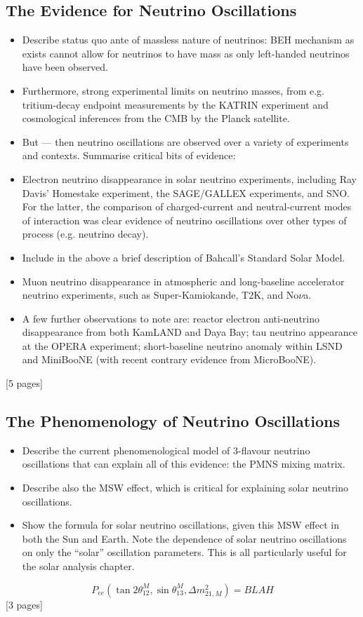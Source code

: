 {\subsection{The Evidence for Neutrino Oscillations}\label{sec:nu_osc_evidence}
\begin{itemize}
    \item Describe status quo ante of massless nature of neutrinos: BEH mechanism as exists cannot allow for neutrinos to have mass as only left-handed neutrinos have been observed.
    \item Furthermore, strong experimental limits on neutrino masses, from e.g. tritium-decay endpoint measurements by the KATRIN experiment and cosmological inferences from the CMB by the Planck satellite.
    \item But --- then neutrino oscillations are observed over a variety of experiments and contexts. Summarise critical bits of evidence:
    \item Electron neutrino disappearance in solar neutrino experiments, including Ray Davis' Homestake experiment, the SAGE/GALLEX experiments, and SNO. For the latter, the comparison of charged-current and neutral-current modes of interaction was clear evidence of neutrino oscillations over other types of process (e.g. neutrino decay).
    \item Include in the above a brief description of Bahcall's Standard Solar Model.
    \item Muon neutrino disappearance in atmospheric and long-baseline accelerator neutrino experiments, such as Super-Kamiokande, T2K, and No$\nu$a.
    \item A few further observations to note are: reactor electron anti-neutrino disappearance from both KamLAND and Daya Bay; tau neutrino appearance at the OPERA experiment; short-baseline neutrino anomaly within LSND and MiniBooNE (with recent contrary evidence from MicroBooNE).
\end{itemize}
[5 pages]
\subsection{The Phenomenology of Neutrino Oscillations}
\begin{itemize}
    \item Describe the current phenomenological model of 3-flavour neutrino oscillations that can explain all of this evidence: the PMNS mixing matrix.
    \item Describe also the MSW effect, which is critical for explaining solar neutrino oscillations.
    \item Show the formula for solar neutrino oscillations, given this MSW effect in both the Sun and Earth. Note the dependence of solar neutrino oscillations on only the ``solar'' oscillation parameters. This is all particularly useful for the solar analysis chapter.
\end{itemize}
\begin{equation}\label{eq:pee_msw}
    P_{ee}\left(\tan2\theta^{M}_{12}, \sin\theta^{M}_{13}, \Delta m^{2}_{21,M}\right) = BLAH
\end{equation}
[3 pages]
}
